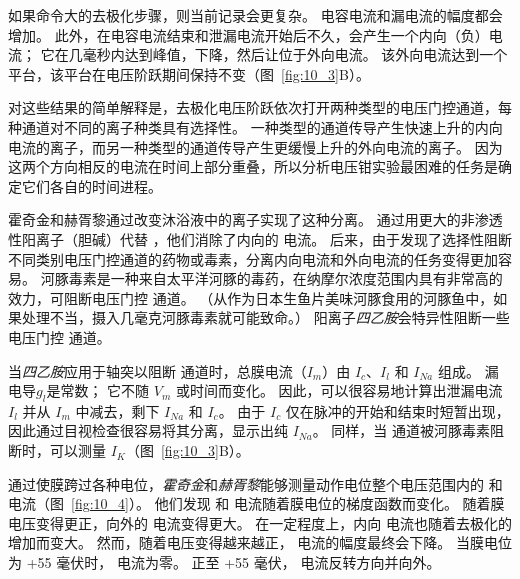 如果命令大的去极化步骤，则当前记录会更复杂。
电容电流和漏电流的幅度都会增加。
此外，在电容电流结束和泄漏电流开始后不久，会产生一个内向（负）电流；
它在几毫秒内达到峰值，下降，然后让位于外向电流。
该外向电流达到一个平台，该平台在电压阶跃期间保持不变（图~\ref{fig:10_3}B）。


对这些结果的简单解释是，去极化电压阶跃依次打开两种类型的电压门控通道，每种通道对不同的离子种类具有选择性。
一种类型的通道传导产生快速上升的内向电流的离子，而另一种类型的通道传导产生更缓慢上升的外向电流的离子。
因为这两个方向相反的电流在时间上部分重叠，所以分析电压钳实验最困难的任务是确定它们各自的时间进程。


霍奇金和赫胥黎通过改变沐浴液中的离子实现了这种分离。
通过用更大的非渗透性阳离子（胆碱）代替 ，他们消除了内向的  电流。
后来，由于发现了选择性阻断不同类别电压门控通道的药物或毒素，分离内向电流和外向电流的任务变得更加容易。
河豚毒素是一种来自太平洋河豚的毒药，在纳摩尔浓度范围内具有非常高的效力，可阻断电压门控  通道。
（从作为日本生鱼片美味河豚食用的河豚鱼中，如果处理不当，摄入几毫克河豚毒素就可能致命。）
阳离子\textit{四乙胺}会特异性阻断一些电压门控  通道。


当\textit{四乙胺}应用于轴突以阻断  通道时，总膜电流（$I_m$）由 $I_c$、$I_l$ 和 $I_{Na}$ 组成。
漏电导$g_l$是常数；
它不随 $V_m$ 或时间而变化。
因此，可以很容易地计算出泄漏电流 $I_l$ 并从 $I_m$ 中减去，剩下 $I_{Na}$ 和 $I_c$。
由于 $I_c$ 仅在脉冲的开始和结束时短暂出现，因此通过目视检查很容易将其分离，显示出纯 $I_{Na}$。
同样，当  通道被河豚毒素阻断时，可以测量 $I_K$（图~\ref{fig:10_3}B）。


通过使膜跨过各种电位，\textit{霍奇金}和\textit{赫胥黎}能够测量动作电位整个电压范围内的  和  电流（图~\ref{fig:10_4}）。
他们发现  和  电流随着膜电位的梯度函数而变化。
随着膜电压变得更正，向外的  电流变得更大。
在一定程度上，内向  电流也随着去极化的增加而变大。
然而，随着电压变得越来越正， 电流的幅度最终会下降。
当膜电位为 +55 毫伏时， 电流为零。
正至 +55 毫伏， 电流反转方向并向外。


